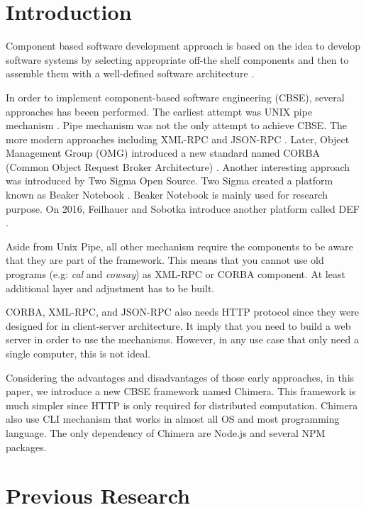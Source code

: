 \documentclass[conference]{IEEEtran}
\begin{document}
\IEEEpeerreviewmaketitle

\section{Introduction}

Component based software development approach is based on the idea to develop 
software systems by selecting appropriate off-the shelf components and then to 
assemble them with a well-defined software architecture \cite{kaur2010component}.

In order to implement component-based software engineering (CBSE), several 
approaches has beeen performed. The earliest attempt was UNIX pipe mechanism 
\cite{mcilroy1968mass}. Pipe mechanism was not the only attempt to achieve CBSE.
The more modern approaches including XML-RPC \cite{xmlrpc} and JSON-RPC \cite{jsonrpc}. 
Later, Object Management Group (OMG) introduced a new standard named CORBA (Common
Object Request Broker Architecture) \cite{corba}. Another interesting approach was 
introduced by Two Sigma Open Source. Two Sigma created a platform known as Beaker
Notebook \cite{beakernotebook}. Beaker Notebook is mainly used for research purpose. 
On 2016, Feilhauer and Sobotka introduce another platform called DEF 
\cite{feilhauer2016def}.

Aside from Unix Pipe, all other mechanism require the components to be aware that 
they are part of the framework. This means that you cannot use old programs (e.g:
{\it cal} and {\it cowsay}) as XML-RPC or CORBA component. At least additional layer
and adjustment has to be built.

CORBA, XML-RPC, and JSON-RPC also needs HTTP protocol since they were designed for 
in client-server architecture. It imply that you need to build a web server in order
to use the mechanisms. However, in any use case that only need a single computer,
this is not ideal.

Considering the advantages and disadvantages of those early approaches, in this paper, 
we introduce a new CBSE framework named Chimera. This framework is much simpler since
HTTP is only required for distributed computation. Chimera also use CLI mechanism that
works in almost all OS and most programming language.
The only dependency of Chimera are Node.js and several NPM packages.

\section{Previous Research}
\end{document}

